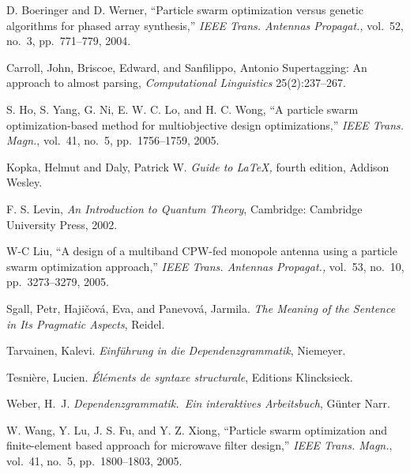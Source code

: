 
\begin{thebibliography}{xx}

D. Boeringer and D. Werner,
``Particle swarm optimization versus genetic algorithms for
phased array synthesis,''
\textit{IEEE Trans. Antennas Propagat.,}
vol.~52, no.~3, pp.~771--779, 2004.

Carroll, John, Briscoe, Edward, and Sanfilippo, Antonio
Supertagging: An approach to almost parsing,
\textit{Computational Linguistics} 25(2):237--267.

S. Ho, S. Yang, G. Ni, E. W. C. Lo, and H. C. Wong,
``A particle swarm optimization-based method for multiobjective
design optimizations,''
\textit{IEEE Trans. Magn.},
vol.~41, no.~5, pp.~1756--1759, 2005.

Kopka, Helmut and Daly, Patrick W. 
\textit{Guide to \LaTeX,} fourth edition, Addison Wesley.

F. S. Levin,
\textit{An Introduction to Quantum Theory},
Cambridge: Cambridge University Press, 2002.

W-C Liu,
``A design of a multiband
CPW-fed monopole antenna using a particle swarm optimization approach,''
\textit{IEEE Trans. Antennas Propagat.,}
vol.~53, no.~10, pp.~3273--3279, 2005.

Sgall, Petr, Haji\v{c}ov\'{a}, Eva, and Panevov\'{a}, Jarmila.
\textit{The Meaning of the Sentence in Its Pragmatic Aspects}, Reidel.

Tarvainen, Kalevi.  
\textit{Einf\"{u}hrung in die {D}ependenzgrammatik}, Niemeyer.

Tesni{\`e}re, Lucien.  
\textit{\'El\'ements de syntaxe structurale}, Editions Klincksieck.

Weber, H.~J. 
\textit{Dependenzgrammatik.\ Ein interaktives Arbeitsbuch},
G\"unter Narr.

W. Wang, Y. Lu, J. S. Fu, and Y. Z. Xiong,
``Particle swarm optimization and finite-element based
approach for microwave filter design,''
\textit{IEEE Trans. Magn.},
vol.~41, no.~5, pp.~1800--1803, 2005.

\end{thebibliography}

